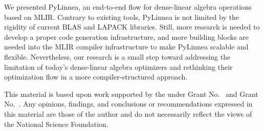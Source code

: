 \documentclass[conference]{IEEEtran}
\begin{document}
We presented PyLinnea, an end-to-end flow for dense-linear algebra operations
based on MLIR. Contrary to existing tools, PyLinnea is not limited by the
rigidity of current BLAS and LAPACK libraries. Still, more research is needed
to develop a proper code generation infrastructure, and more building blocks
are needed into the MLIR compiler infrastructure to make PyLinnea scalable and
flexible. Nevertheless, our research is a small step toward addressing the
limitation of today's dense-linear algebra optimizers and rethinking their
optimization flow in a more compiler-structured approach.

\ifx\paperversion\paperversioncameraIEEE
\else
\begin{acks}                            %
  This material is based upon work supported by the
   under Grant
  No.~ and Grant
  No.~.  Any opinions, findings, and
  conclusions or recommendations expressed in this material are those
  of the author and do not necessarily reflect the views of the
  National Science Foundation.
\end{acks}
\fi


\end{document}
